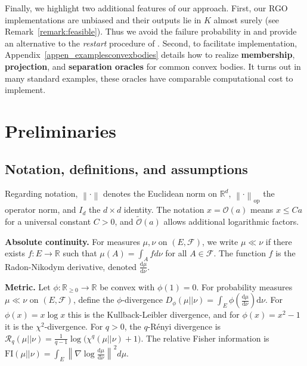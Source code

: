 \documentclass[11pt,letterpaper]{article}
\newcommand{\R}{\mathbb{R}}
\newcommand{\norm}[1]{\left\lVert #1 \right\rVert}
\newcommand{\opnorm}[1]{\norm{#1}_{\operatorname{op}}}
\newcommand{\D}{\mathrm{d}}
\begin{document}
Finally, we highlight two additional features of our approach. First, our RGO implementations are unbiased and their outputs lie in $K$ almost surely (see Remark~\ref{remark:feasible}). Thus we avoid the failure probability in \cite{kook2024inandout,kook2025algodiffusion,kook2025coldstart} and provide an alternative to the \textit{restart} procedure of \cite{kook2025zeroth}. Second, to facilitate implementation, Appendix~\ref{appen_examplesconvexbodies} details how to realize \textbf{membership}, \textbf{projection}, and \textbf{separation oracles} for common convex bodies. It turns out in many standard examples, these oracles have comparable computational cost to implement.



 




\section{Preliminaries}
\label{sec:prelim}

\subsection{Notation, definitions, and assumptions}
Regarding notation, $\norm{\cdot}$ denotes the Euclidean norm on $\R^d$, $\opnorm{\cdot}$ the operator norm, and $I_d$ the $d\times d$ identity. The notation $x=\mathcal{O}(a)$ means $x\le Ca$ for a universal constant $C>0$, and $\tilde{\mathcal{O}}(a)$ allows additional logarithmic factors.

\textbf{Absolute continuity.} For measures $\mu,\nu$ on $(E,\mathcal{F})$, we write $\mu\ll\nu$ if there exists $f:E\to\R$ such that $\mu(A)=\int_A f d\nu$ for all $A\in\mathcal{F}$. The function $f$ is the Radon-Nikodym derivative, denoted $\frac{\D\mu}{\D\nu}$.

\textbf{Metric.} Let $\phi:\R_{\ge0}\to\R$ be convex with $\phi(1)=0$. For probability measures $\mu\ll\nu$ on $(E,\mathcal{F})$, define the $\phi$-divergence $D_\phi(\mu||\nu)=\int_E \phi\!\left(\frac{\D\mu}{\D\nu}\right)\D\nu$. For $\phi(x)=x\log x$ this is the Kullback-Leibler divergence, and for $\phi(x)=x^2-1$ it is the $\chi^2$-divergence. For $q>0$, the $q$-R\'enyi divergence is $\mathcal{R}_q(\mu||\nu)=\frac{1}{q-1}\log\!\bigl(\chi^q(\mu||\nu)+1\bigr)$. The relative Fisher information is $\mathrm{FI}(\mu||\nu)=\int_E \norm{\nabla \log \frac{\D\mu}{\D\nu}}^2 d\mu$.
\end{document}
